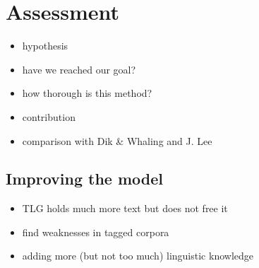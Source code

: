 \chapter{Assessment}
\label{chp:assessment}

\begin{itemize}
\item hypothesis
\item have we reached our goal?
\item how thorough is this method?
\item contribution
\item comparison with Dik \& Whaling and J. Lee
\end{itemize}

\section{Improving the model}
\begin{itemize}
\item TLG holds much more text but does not free it
\item find weaknesses in tagged corpora
\item adding more (but not too much) linguistic knowledge
\end{itemize}